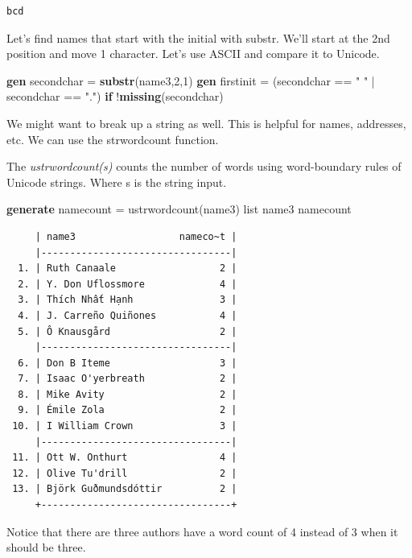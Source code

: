 \documentclass[
]{book}
\newenvironment{Shaded}{\begin{snugshade}}{\end{snugshade}}
\newcommand{\FunctionTok}[1]{\textcolor[rgb]{0.13,0.29,0.53}{\textbf{#1}}}
\newcommand{\KeywordTok}[1]{\textcolor[rgb]{0.13,0.29,0.53}{\textbf{#1}}}
\newcommand{\NormalTok}[1]{#1}
\newcommand{\OtherTok}[1]{\textcolor[rgb]{0.56,0.35,0.01}{#1}}
\newcommand{\StringTok}[1]{\textcolor[rgb]{0.31,0.60,0.02}{#1}}
\begin{document}
\begin{verbatim}
bcd
\end{verbatim}

Let's find names that start with the initial with substr. We'll start at the 2nd position and move 1 character. Let's use ASCII and compare it to Unicode.

\begin{Shaded}
\begin{Highlighting}[]
\KeywordTok{gen}\NormalTok{ secondchar = }\FunctionTok{substr}\NormalTok{(name3,2,1)}
\KeywordTok{gen}\NormalTok{ firstinit = (secondchar == }\StringTok{" "}\NormalTok{ | secondchar == }\StringTok{"."}\NormalTok{) }\KeywordTok{if}\NormalTok{ !}\FunctionTok{missing}\NormalTok{(secondchar)}
\end{Highlighting}
\end{Shaded}

We might want to break up a string as well. This is helpful for names, addresses, etc.
We can use the strwordcount function.

The \emph{ustrwordcount(s)} counts the number of words using word-boundary rules of Unicode strings. Where s is the string input.

\begin{Shaded}
\begin{Highlighting}[]
\KeywordTok{generate}\NormalTok{ namecount = ustrwordcount(name3)}
\OtherTok{list}\NormalTok{ name3 namecount}
\end{Highlighting}
\end{Shaded}

\begin{verbatim}
     | name3                  nameco~t |
     |---------------------------------|
  1. | Ruth Canaale                  2 |
  2. | Y. Don Uflossmore             4 |
  3. | Thích Nhất Hạnh               3 |
  4. | J. Carreño Quiñones           4 |
  5. | Ô Knausgård                   2 |
     |---------------------------------|
  6. | Don B Iteme                   3 |
  7. | Isaac O'yerbreath             2 |
  8. | Mike Avity                    2 |
  9. | Émile Zola                    2 |
 10. | I William Crown               3 |
     |---------------------------------|
 11. | Ott W. Onthurt                4 |
 12. | Olive Tu'drill                2 |
 13. | Björk Guðmundsdóttir          2 |
     +---------------------------------+
\end{verbatim}

Notice that there are three authors have a word count of 4 instead of 3 when it should be three.
\end{document}
